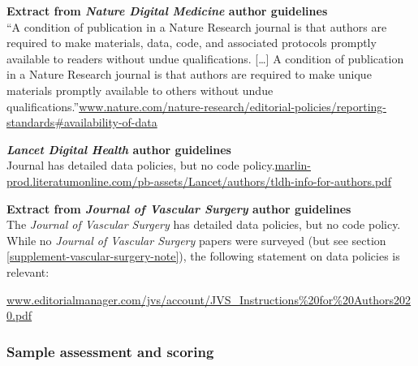 \documentclass[10pt,a4paper]{article}
\begin{document}
\noindent\textbf{Extract from \emph{Nature Digital Medicine\/} author guidelines}\\
{\sf``A condition of publication in a Nature Research journal is that authors are required to make materials, data, code, and associated protocols promptly available to readers without undue qualifications. [\ldots] A condition of publication in a Nature Research journal is that authors are required to make unique materials promptly available to others without undue qualifications.''}\specifyurl\url{www.nature.com/nature-research/editorial-policies/reporting-standards#availability-of-data}

\noindent\textbf{\emph{Lancet Digital Health\/} author guidelines}\\
Journal has detailed data policies, but no code policy.\specifyurl\url{marlin-prod.literatumonline.com/pb-assets/Lancet/authors/tldh-info-for-authors.pdf}

\noindent\textbf{Extract from \emph{Journal of Vascular Surgery\/} author guidelines}\\
The \emph{Journal of Vascular Surgery\/} has detailed data policies, but no code policy. While no \emph{Journal of Vascular Surgery\/} papers were surveyed (but see section \ref{supplement-vascular-surgery-note}), the following statement on data policies is relevant:

\vskip 3mm \specifyurl\url{www.editorialmanager.com/jvs/account/JVS_Instructions%20for%20Authors2020.pdf}

\subsubsection{Sample assessment and scoring}
\end{document}
